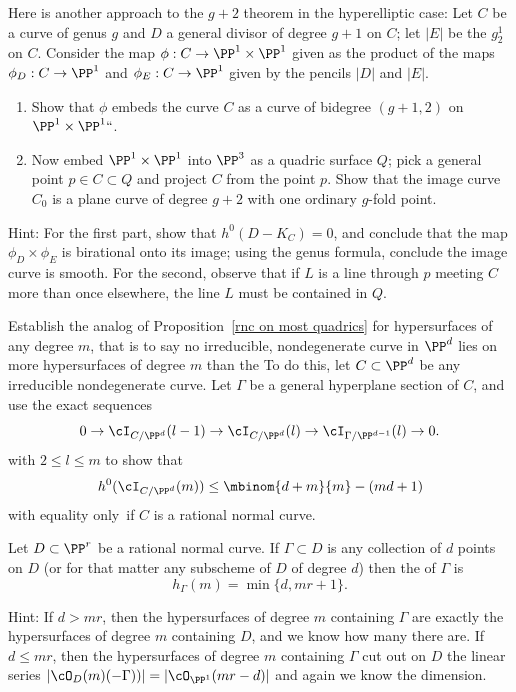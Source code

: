 \begin{exercise}
Here is another approach to the $g+2$ theorem in the hyperelliptic case:
%
Let $C$ be a 
%
curve of genus $g$ and $D$ a general divisor
of degree $g+1$ on $C$; let $|E|$ be the $g^1_2$ on $C$.
Consider the map $\phi : C \to \PP^1 \times \PP^1$ given as the product
of the maps $\phi_D : C \to \PP^1$ and $\phi_E : C \to \PP^1$ given by
the pencils $|D|$ and $|E|$.
\begin{enumerate}
\item Show that $\phi$ embeds the curve $C$ as a curve of bidegree
$(g+1,2)$ on $\PP^1 \times \PP^1` `$.
\item Now embed $\PP^1 \times \PP^1$ into $\PP^3$ as a quadric surface
$Q$; pick a general point $p \in C \subset Q$ and project $C$ from the
point $p$. Show that the image curve $C_0$ is a plane curve of degree
$g+2$ with one ordinary $g$-fold point.
\end{enumerate}

Hint: For the first part, show that $h^0(D - K_C) = 0$, and conclude
that the map $\phi_D \times \phi_E$ is birational onto its image; 
using
the genus formula, conclude the image curve is smooth. For the
second, observe that if $L$ is a line through $p$ meeting $C$ more than
once elsewhere, the line $L$ must be contained in $Q$.
\end{exercise}

\begin{exercise}\label{extremal m-ics}
Establish the analog of Proposition~\ref{rnc on most quadrics}
for hypersurfaces of any degree $m$, that is to say no irreducible,
nondegenerate curve in $\PP^d$ lies on more hypersurfaces of degree $m$
than the 
%
To do this, let $C\subset \PP^d$ be any irreducible nondegenerate
curve. Let $\Gamma$ be a general hyperplane section
of $C$, and use the exact sequences
$$
0 \to \cI_{C/\PP^d}(l-1) \to \cI_{C/\PP^d}(l) \to
\cI_{\Gamma/\PP^{d-1}}(l) \to 0.
$$
with $2 \leq l \leq m$ to show that
$$
h^0(\cI_{C/\PP^d}(m)) \leq  \mbinom{d+m}{m} - (md+1)
$$
with equality only~if $C$ is a rational normal curve.
\end{exercise}

\begin{exercise}\label{linear bound is sharp}
Let $D \subset \PP^r$ be a rational normal curve. If $\Gamma \subset D$
is any collection of $d$ points on $D$ (or for that matter any subscheme
of $D$ of degree $d$) then the 
%
of $\Gamma$ is
$$
h_\Gamma(m) = \min\{d, mr+1\}
.
$$

Hint: If $d > mr$, then the hypersurfaces of degree $m$ containing
$\Gamma$ are exactly the hypersurfaces of degree $m$ containing $D$,
and we know how many there are. If $d \leq mr$, then the hypersurfaces
of degree $m$ containing $\Gamma$ cut out on $D$ the linear series
$|\cO_D(m)(-\Gamma))| = |\cO_{\PP^1}(mr-d)|$ and again we know the
dimension.
\end{exercise}

